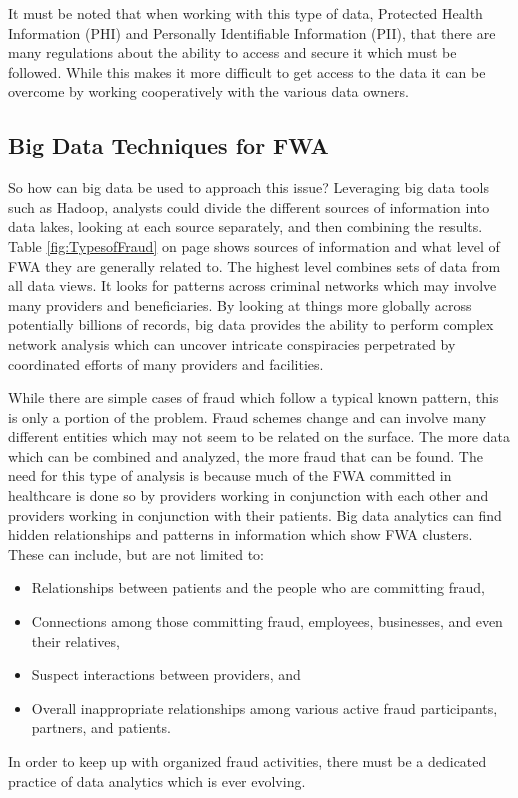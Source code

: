 \documentclass[sigconf]{acmart}
\begin{document}
It must be noted that when working with this type of data, Protected Health Information
(PHI) and Personally Identifiable Information (PII), that there are many regulations about
the ability to access and secure it which must be followed.  While this makes it more
difficult to get access to the data it can be overcome by working cooperatively with the 
various data owners.  
  

\subsection{Big Data Techniques for FWA}

So how can big data be used to approach this issue?  Leveraging big data tools such as 
Hadoop, analysts could divide the different sources of information into data lakes, 
looking at each source separately, and then combining the results.  Table 
\ref{fig:TypesofFraud} on page \pageref{fig:TypesofFraud} shows sources of information 
and what level of FWA they are generally related to.  The highest level combines sets 
of data from all data views.  It looks for patterns across criminal networks which may 
involve many providers and beneficiaries.  By looking at things more globally across 
potentially billions of records, big data provides the ability to perform complex 
network analysis which can uncover intricate conspiracies perpetrated by coordinated 
efforts of many providers and facilities.\cite{THORNTON20131252} 

While there are simple cases of fraud which follow 
a typical known pattern, this is only a portion of the problem.  Fraud schemes 
change and can involve many different entities which may not seem to be related on the 
surface.  The more data which can be combined and analyzed, the more fraud that can be 
found.  The need for this type of analysis is because much of the FWA committed in 
healthcare is done so by providers working in conjunction with each other and providers 
working in conjunction with their patients.\cite{LexisNexis}  Big data analytics can 
find hidden relationships and patterns in information which show FWA clusters.  These 
can include, but are not limited to:  
\begin{itemize}
  \item Relationships between patients and the people who are committing fraud,
  \item Connections among those committing fraud, employees, businesses, and even their 
  relatives,
  \item Suspect interactions between providers, and
  \item Overall inappropriate relationships among various active fraud participants, 
  partners, and patients.\cite{LexisNexis}
\end{itemize}
In order to keep up with organized fraud activities, there must be a dedicated practice 
of data analytics which is ever evolving. 
\end{document}
